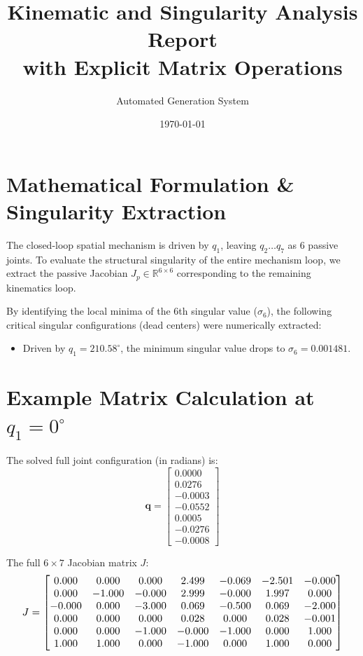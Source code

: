 \documentclass[12pt,a4paper]{article}
\title{\textbf{Kinematic and Singularity Analysis Report \\ with Explicit Matrix Operations}}
\author{Automated Generation System}
\date{\today}
\begin{document}
\maketitle

\section{Mathematical Formulation \& Singularity Extraction}
The closed-loop spatial mechanism is driven by $q_1$, leaving $q_2 \dots q_7$ as 6 passive joints. To evaluate the structural singularity of the entire mechanism loop, we extract the passive Jacobian $J_p \in \mathbb{R}^{6 \times 6}$ corresponding to the remaining kinematics loop. 

By identifying the local minima of the 6th singular value ($\sigma_6$), the following critical singular configurations (dead centers) were numerically extracted:
\begin{itemize}
    \item Driven by $q_1 = 210.58^\circ$, the minimum singular value drops to $\sigma_6 = 0.001481$.
\end{itemize}

\section{Example Matrix Calculation at $q_1 = 0^\circ$}
The solved full joint configuration (in radians) is:
\begin{equation}
    \mathbf{q} = \begin{bmatrix} 0.0000 \\ 0.0276 \\ -0.0003 \\ -0.0552 \\ 0.0005 \\ -0.0276 \\ -0.0008 \end{bmatrix}
\end{equation}

The full $6 \times 7$ Jacobian matrix $J$:
\begin{equation}
    \resizebox{0.95\textwidth}{!}{$ J = \begin{bmatrix}
  0.000 & 0.000 & 0.000 & 2.499 & -0.069 & -2.501 & -0.000 \\
  0.000 & -1.000 & -0.000 & 2.999 & -0.000 & 1.997 & 0.000 \\
  -0.000 & 0.000 & -3.000 & 0.069 & -0.500 & 0.069 & -2.000 \\
  0.000 & 0.000 & 0.000 & 0.028 & 0.000 & 0.028 & -0.001 \\
  0.000 & 0.000 & -1.000 & -0.000 & -1.000 & 0.000 & 1.000 \\
  1.000 & 1.000 & 0.000 & -1.000 & 0.000 & 1.000 & 0.000
\end{bmatrix} $}
\end{equation}
\end{document}
